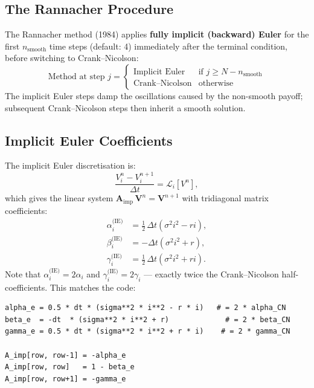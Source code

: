 \documentclass[12pt, a4paper]{article}
\begin{document}
\subsection{The Rannacher Procedure}

The Rannacher method (1984) applies \textbf{fully implicit (backward) Euler}
for the first $n_{\text{smooth}}$ time steps (default: 4) immediately after
the terminal condition, before switching to Crank--Nicolson:
\begin{equation}
    \text{Method at step } j =
    \begin{cases}
        \text{Implicit Euler} & \text{if } j \geq N - n_{\text{smooth}} \\
        \text{Crank--Nicolson} & \text{otherwise}
    \end{cases}
\end{equation}
The implicit Euler steps damp the oscillations caused by the non-smooth
payoff; subsequent Crank--Nicolson steps then inherit a smooth solution.

\subsection{Implicit Euler Coefficients}

The implicit Euler discretisation is:
\[
    \frac{V_i^n - V_i^{n+1}}{\Delta t} = \mathcal{L}_i[V^n],
\]
which gives the linear system $\mathbf{A}_{\text{imp}}\,\bm{V}^n =
\bm{V}^{n+1}$ with tridiagonal matrix coefficients:
\begin{align}
    \alpha_i^{\text{(IE)}} &= \frac{1}{2}\,\Delta t(\sigma^2 i^2 - ri),
    \label{eq:alpha_imp} \\
    \beta_i^{\text{(IE)}}  &= -\Delta t(\sigma^2 i^2 + r),
    \label{eq:beta_imp} \\
    \gamma_i^{\text{(IE)}} &= \frac{1}{2}\,\Delta t(\sigma^2 i^2 + ri).
    \label{eq:gamma_imp}
\end{align}
Note that $\alpha_i^{\text{(IE)}} = 2\alpha_i$ and $\gamma_i^{\text{(IE)}} =
2\gamma_i$ — exactly twice the Crank--Nicolson half-coefficients. This matches
the code:
\begin{lstlisting}
alpha_e = 0.5 * dt * (sigma**2 * i**2 - r * i)   # = 2 * alpha_CN
beta_e  = -dt  * (sigma**2 * i**2 + r)             # = 2 * beta_CN
gamma_e = 0.5 * dt * (sigma**2 * i**2 + r * i)    # = 2 * gamma_CN

A_imp[row, row-1] = -alpha_e
A_imp[row, row]   = 1 - beta_e
A_imp[row, row+1] = -gamma_e
\end{lstlisting}
\end{document}

